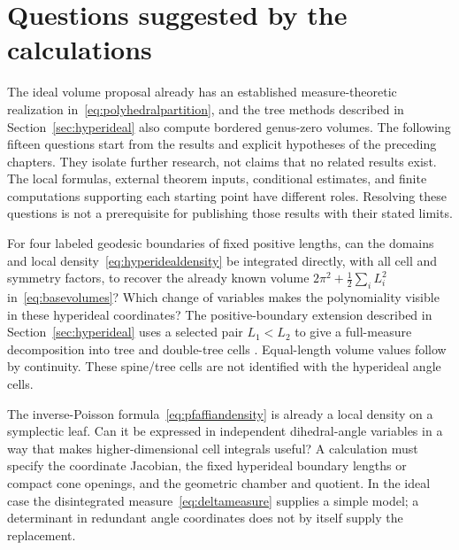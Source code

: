 \section{Questions suggested by the calculations}
\label{sec:questions}

The ideal volume proposal already has an established measure-theoretic
realization in~\eqref{eq:polyhedralpartition}, and the tree methods described
in Section~\ref{sec:hyperideal} also compute bordered genus-zero volumes.
The following fifteen questions start from the results and explicit
hypotheses of the preceding chapters. They isolate further research,
not claims that no related results exist. The local formulas, external
theorem inputs, conditional estimates, and finite computations supporting
each starting point have different roles. Resolving these questions is
not a prerequisite for publishing those results with their stated limits.

\begin{question}
For four labeled geodesic boundaries of fixed positive lengths, can the
domains and local density~\eqref{eq:hyperidealdensity} be integrated
directly, with all cell and symmetry factors, to recover the already
known volume $2\pi^2+\frac12\sum_iL_i^2$ in~\eqref{eq:basevolumes}?
Which change of variables makes the polynomiality visible in these
hyperideal coordinates? The positive-boundary extension described in
Section~\ref{sec:hyperideal} uses a selected pair $L_1<L_2$ to give a
full-measure decomposition into tree and double-tree cells
\cite[Theorem~3]{Zonneveld}. Equal-length volume values follow by
continuity. These spine/tree cells are not identified with the
hyperideal angle cells.
\end{question}

\begin{question}
The inverse-Poisson formula~\eqref{eq:pfaffiandensity} is already a local
density on a symplectic leaf. Can it be expressed in independent
dihedral-angle variables in a way that makes higher-dimensional cell
integrals useful? A calculation must specify the coordinate Jacobian,
the fixed hyperideal boundary lengths or compact cone openings, and the
geometric chamber and quotient. In the ideal case the disintegrated
measure~\eqref{eq:deltameasure} supplies a simple model; a determinant
in redundant angle coordinates does not by itself supply the replacement.
\end{question}

